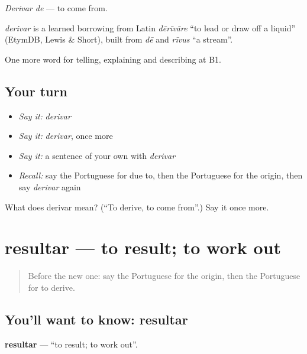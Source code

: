 \emph{Derivar de} — to come from.

\begin{cousinweb}
\emph{derivar} is a learned borrowing from Latin \emph{dērīvāre} \textquotedblleft{}to lead or draw off a liquid\textquotedblright{} (EtymDB, Lewis \& Short), built from \emph{dē} and \emph{rīvus} \textquotedblleft{}a stream\textquotedblright{}.
\end{cousinweb}

\begin{grammarlens}[title={What you've built}]
One more word for telling, explaining and describing at B1.
\end{grammarlens}

\subsection*{Your turn}
\begin{itemize}
\raggedright
  \item \emph{Say it:} \emph{derivar}
  \item \emph{Say it:} \emph{derivar}, once more
  \item \emph{Say it:} a sentence of your own with \emph{derivar}
  \item \emph{Recall:} say the Portuguese for due to, then the Portuguese for the origin, then say \emph{derivar} again
\end{itemize}

\begin{tcolorbox}[breakable,colback=teal!4,colframe=teal!35!black,title={Before you move on}]
What does derivar mean? (\textquotedblleft{}To derive, to come from\textquotedblright{}.) Say it once more.
\end{tcolorbox}
\section[resultar]{resultar — to result; to work out}

\label{lesson:PT-C350-resultar}



\begin{quote}
Before the new one: say the Portuguese for the origin, then the Portuguese for to derive.
\end{quote}

\subsection*{You'll want to know: resultar}
\textbf{resultar} — \textquotedblleft{}to result; to work out\textquotedblright{}.

